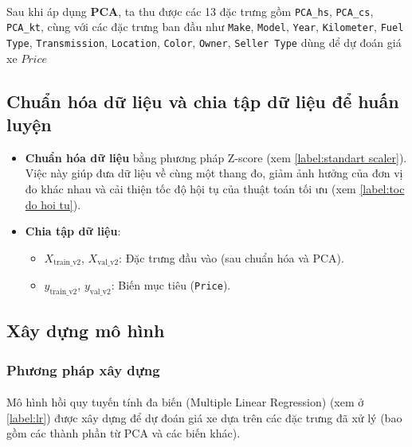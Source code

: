 \paragraph{}{Sau khi áp dụng \textbf{PCA}, ta thu được các 13 đặc trưng gồm \texttt{PCA\_hs}, \texttt{PCA\_cs}, \texttt{PCA\_kt}, cùng với các đặc trưng ban đầu như \texttt{Make}, \texttt{Model}, \texttt{Year}, \texttt{Kilometer}, \texttt{Fuel Type}, \texttt{Transmission}, \texttt{Location}, \texttt{Color}, \texttt{Owner}, \texttt{Seller Type} dùng dể dự đoán giá xe $Price$}

\label{sec:training_evaluation}

\subsection{Chuẩn hóa dữ liệu và chia tập dữ liệu để huấn luyện}
\label{subsec:preprocessing}

\begin{itemize}
    \item \textbf{Chuẩn hóa dữ liệu} bằng phương pháp Z-score (xem \ref{label:standart scaler}). Việc này giúp đưa dữ liệu về cùng một thang đo, giảm ảnh hưởng của đơn vị đo khác nhau và cải thiện tốc độ hội tụ của thuật toán tối ưu (xem \ref{label:toc do hoi tu}).
    \item \textbf{Chia tập dữ liệu}:
    \begin{itemize}
        \item $X_{\text{train\_v2}}$, $X_{\text{val\_v2}}$: Đặc trưng đầu vào (sau chuẩn hóa và PCA).
        \item $y_{\text{train\_v2}}$, $y_{\text{val\_v2}}$: Biến mục tiêu (\texttt{Price}).
    \end{itemize}
\end{itemize}

\subsection{Xây dựng mô hình}
\label{subsec:model_building}
\subsubsection{Phương pháp xây dựng}
\paragraph{}{Mô hình hồi quy tuyến tính đa biến (Multiple Linear Regression) (xem ở \ref{label:lr}) được xây dựng để dự đoán giá xe dựa trên các đặc trưng đã xử lý (bao gồm các thành phần từ PCA và các biến khác).}

